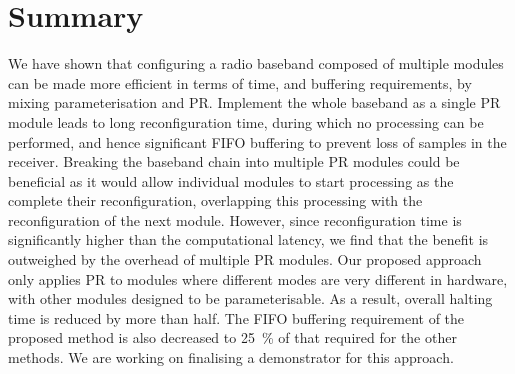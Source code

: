 \section{Summary}
We have shown that configuring a radio baseband composed of multiple modules can be made more efficient in terms of time, and buffering requirements, by mixing parameterisation and PR.
Implement the whole baseband as a single PR module leads to long reconfiguration time, during which no processing can be performed, and hence significant FIFO buffering to prevent loss of samples in the receiver.
Breaking the baseband chain into multiple PR modules could be beneficial as it would allow individual modules to start processing as the complete their reconfiguration, overlapping this processing with the reconfiguration of the next module. However, since reconfiguration time is significantly higher than the computational latency, we find that the benefit is outweighed by the overhead of multiple PR modules.
Our proposed approach only applies PR to modules where different modes are very different in hardware, with other modules designed to be parameterisable. As a result, overall halting time is reduced by more than half.
The FIFO buffering requirement of the proposed method is also decreased to 25~\% of that required for the other methods.
We are working on finalising a demonstrator for this approach.